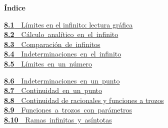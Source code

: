 \documentclass[11pt,a4paper]{article}
\begin{document}
\begin{tcolorbox}[colback=fmsurface,colframe=fmsurface,arc=3mm,left=4mm,right=4mm,top=2mm,bottom=2mm]
\small\textbf{Índice}\par\smallskip
\begin{minipage}[t]{0.49\linewidth}\small \hyperlink{sec1}{\textbf{\color{fmgreen}8.1}\ \ Límites en el infinito: lectura gráfica}\\[3pt]
\mbox{\hyperlink{sec2}{\textbf{\color{fmgreen}8.2}\ \ Cálculo analítico en el infinito}}\\[3pt]
\mbox{\hyperlink{sec3}{\textbf{\color{fmgreen}8.3}\ \ Comparación de infinitos}}\\[3pt]
\mbox{\hyperlink{sec4}{\textbf{\color{fmgreen}8.4}\ \ Indeterminaciones en el infinito}}\\[3pt]
\mbox{\hyperlink{sec5}{\textbf{\color{fmgreen}8.5}\ \ Límites en un número}}\\[3pt]\end{minipage}\hfill\begin{minipage}[t]{0.49\linewidth}\small \mbox{\hyperlink{sec6}{\textbf{\color{fmgreen}8.6}\ \ Indeterminaciones en un punto}}\\[3pt]
\mbox{\hyperlink{sec7}{\textbf{\color{fmgreen}8.7}\ \ Continuidad en un punto}}\\[3pt]
\hyperlink{sec8}{\textbf{\color{fmgreen}8.8}\ \ Continuidad de racionales y funciones a trozos}\\[3pt]
\mbox{\hyperlink{sec9}{\textbf{\color{fmgreen}8.9}\ \ Funciones a trozos con parámetros}}\\[3pt]
\mbox{\hyperlink{sec10}{\textbf{\color{fmgreen}8.10}\ \ Ramas infinitas y asíntotas}}\\[3pt]\end{minipage}
\end{tcolorbox}

\Needspace{5.7cm}
\end{document}
